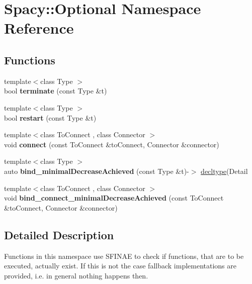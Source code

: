 \hypertarget{namespaceSpacy_1_1Optional}{\section{\-Spacy\-:\-:\-Optional \-Namespace \-Reference}
\label{namespaceSpacy_1_1Optional}
}
\subsection*{\-Functions}
\begin{DoxyCompactItemize}
\item 
\hypertarget{namespaceSpacy_1_1Optional_afc94d50f5d9d1b2b53b374d58fc0089f}{{\footnotesize template$<$class Type $>$ }\\bool {\bfseries terminate} (const \-Type \&t)}\label{namespaceSpacy_1_1Optional_afc94d50f5d9d1b2b53b374d58fc0089f}

\item 
\hypertarget{namespaceSpacy_1_1Optional_af964261e6d0480bfad637d1f707b3777}{{\footnotesize template$<$class Type $>$ }\\bool {\bfseries restart} (const \-Type \&t)}\label{namespaceSpacy_1_1Optional_af964261e6d0480bfad637d1f707b3777}

\item 
\hypertarget{namespaceSpacy_1_1Optional_a5569f8a0db2de323799450dd8fd0b4f2}{{\footnotesize template$<$class To\-Connect , class Connector $>$ }\\void {\bfseries connect} (const \-To\-Connect \&to\-Connect, \-Connector \&connector)}\label{namespaceSpacy_1_1Optional_a5569f8a0db2de323799450dd8fd0b4f2}

\item 
\hypertarget{namespaceSpacy_1_1Optional_a0a13c9e5820ad7987949f7717802f246}{{\footnotesize template$<$class Type $>$ }\\auto {\bfseries bind\-\_\-minimal\-Decrease\-Achieved} (const \-Type \&t)-\/$>$ \hyperlink{namespaceSpacy_afbcee52cc294417930c5ccfc2fefb9f8}{decltype}(\-Detail}\label{namespaceSpacy_1_1Optional_a0a13c9e5820ad7987949f7717802f246}

\item 
\hypertarget{namespaceSpacy_1_1Optional_aec6afd5b7d50849fcbc842976b82c267}{{\footnotesize template$<$class To\-Connect , class Connector $>$ }\\void {\bfseries bind\-\_\-connect\-\_\-minimal\-Decrease\-Achieved} (const \-To\-Connect \&to\-Connect, \-Connector \&connector)}\label{namespaceSpacy_1_1Optional_aec6afd5b7d50849fcbc842976b82c267}

\end{DoxyCompactItemize}


\subsection{\-Detailed \-Description}
\-Functions in this namespace use \-S\-F\-I\-N\-A\-E to check if functions, that are to be executed, actually exist. \-If this is not the case fallback implementations are provided, i.\-e. in general nothing happens then. 